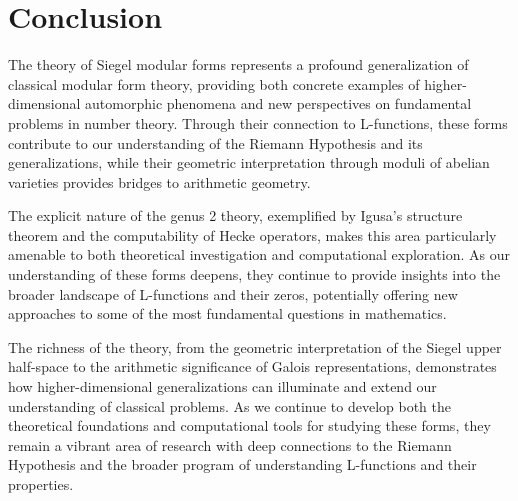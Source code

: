 \section{Conclusion}

The theory of Siegel modular forms represents a profound generalization of classical modular form theory, providing both concrete examples of higher-dimensional automorphic phenomena and new perspectives on fundamental problems in number theory. Through their connection to L-functions, these forms contribute to our understanding of the Riemann Hypothesis and its generalizations, while their geometric interpretation through moduli of abelian varieties provides bridges to arithmetic geometry.

The explicit nature of the genus 2 theory, exemplified by Igusa's structure theorem and the computability of Hecke operators, makes this area particularly amenable to both theoretical investigation and computational exploration. As our understanding of these forms deepens, they continue to provide insights into the broader landscape of L-functions and their zeros, potentially offering new approaches to some of the most fundamental questions in mathematics.

The richness of the theory, from the geometric interpretation of the Siegel upper half-space to the arithmetic significance of Galois representations, demonstrates how higher-dimensional generalizations can illuminate and extend our understanding of classical problems. As we continue to develop both the theoretical foundations and computational tools for studying these forms, they remain a vibrant area of research with deep connections to the Riemann Hypothesis and the broader program of understanding L-functions and their properties.
